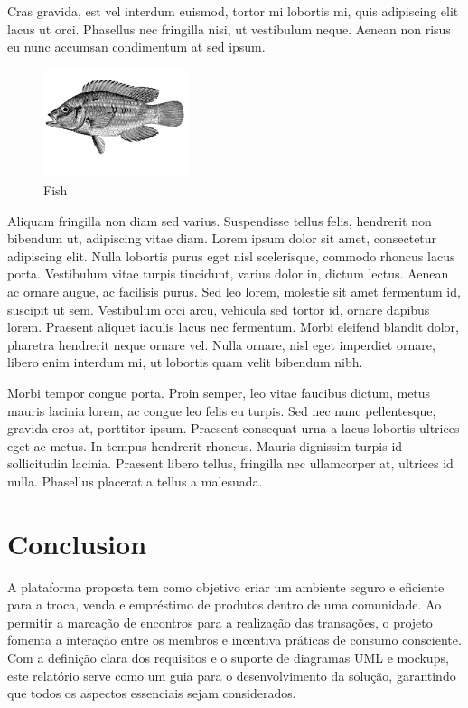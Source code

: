 \documentclass[a4paper, 12pt]{article} %
\begin{document}
Cras gravida, est vel interdum euismod, tortor mi lobortis mi, quis adipiscing elit lacus ut orci. Phasellus nec fringilla nisi, ut vestibulum neque. Aenean non risus eu nunc accumsan condimentum at sed ipsum.
\begin{figure} %
\begin{center}
\includegraphics[width=0.38\textwidth]{fish.png}
\end{center}
\caption{Fish}
\end{figure}
Aliquam fringilla non diam sed varius. Suspendisse tellus felis, hendrerit non bibendum ut, adipiscing vitae diam. Lorem ipsum dolor sit amet, consectetur adipiscing elit. Nulla lobortis purus eget nisl scelerisque, commodo rhoncus lacus porta. Vestibulum vitae turpis tincidunt, varius dolor in, dictum lectus. Aenean ac ornare augue, ac facilisis purus. Sed leo lorem, molestie sit amet fermentum id, suscipit ut sem. Vestibulum orci arcu, vehicula sed tortor id, ornare dapibus lorem. Praesent aliquet iaculis lacus nec fermentum. Morbi eleifend blandit dolor, pharetra hendrerit neque ornare vel. Nulla ornare, nisl eget imperdiet ornare, libero enim interdum mi, ut lobortis quam velit bibendum nibh.

Morbi tempor congue porta. Proin semper, leo vitae faucibus dictum, metus mauris lacinia lorem, ac congue leo felis eu turpis. Sed nec nunc pellentesque, gravida eros at, porttitor ipsum. Praesent consequat urna a lacus lobortis ultrices eget ac metus. In tempus hendrerit rhoncus. Mauris dignissim turpis id sollicitudin lacinia. Praesent libero tellus, fringilla nec ullamcorper at, ultrices id nulla. Phasellus placerat a tellus a malesuada.


\section*{Conclusion}

A plataforma proposta tem como objetivo criar um ambiente seguro e eficiente para a troca, venda e empréstimo de produtos dentro de uma comunidade. Ao permitir a marcação de encontros para a realização das transações, o projeto fomenta a interação entre os membros e incentiva práticas de consumo consciente. 
Com a definição clara dos requisitos e o suporte de diagramas UML e mockups, este relatório serve como um guia para o desenvolvimento da solução, garantindo que todos os aspectos essenciais sejam considerados.
\end{document}
